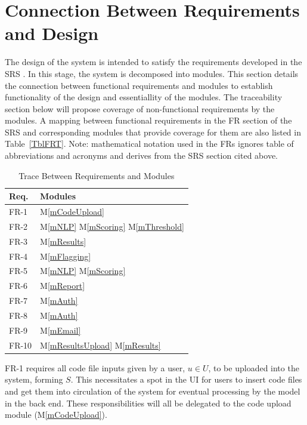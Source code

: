 \documentclass[12pt, titlepage]{article}
\newcommand{\mref}[1]{M\ref{#1}}
\begin{document}
\section{Connection Between Requirements and Design} \label{SecConnection}

The design of the system is intended to satisfy the requirements developed in
the SRS \citep{SRS}. In this stage, the system is decomposed into modules. This 
section details the connection between functional requirements and modules to 
establish functionality of the design and essentiallity of the modules. The
traceability section below will propose coverage of non-functional requirements 
by the modules. A mapping between functional requirements in the FR section of 
the SRS \citep{SRS} and corresponding modules that provide coverage for them are
also listed in Table~\ref{TblFRT}. 
Note: mathematical notation used in the FRs ignores table of abbreviations and acronyms and derives from the SRS section cited above.
\begin{table}[H]
  \centering
  \begin{tabular}{p{} p{}}
  \toprule
  \textbf{Req.} & \textbf{Modules}\\
  \midrule
  FR-1 & \mref{mCodeUpload} \\
  FR-2 & \mref{mNLP} \mref{mScoring} \mref{mThreshold} \\
  FR-3 & \mref{mResults}\\
  FR-4 & \mref{mFlagging}\\
  FR-5 & \mref{mNLP} \mref{mScoring} \\
  FR-6 & \mref{mReport} \\
  FR-7 & \mref{mAuth} \\
  FR-8 & \mref{mAuth} \\
  FR-9 & \mref{mEmail} \\
  FR-10 & \mref{mResultsUpload} \mref{mResults}\\
  \bottomrule
  \end{tabular}
  \caption{Trace Between Requirements and Modules}
  \label{TblRT}
\end{table}

FR-1 requires all code file inputs given by a user, $u \in U$, to be uploaded
into the system, forming $S$. This necessitates a spot in the UI for users to 
insert code files and get them into circulation of the system for eventual
processing by the model in the back end. These responsibilities will all 
be delegated to the code upload module (\mref{mCodeUpload}).\\
\end{document}
